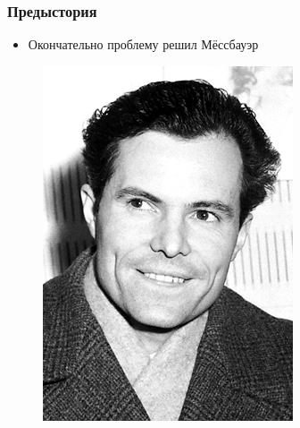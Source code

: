 \documentclass[t]{beamer}
\begin{document}
\begin{frame}
  \frametitle{Предыстория}
  \begin{itemize}
    \item Окончательно проблему решил Мёссбауэр
  \end{itemize}

  \begin{figure}[h]
    \centering
    \includegraphics[height=.7\textheight]{img/messbauer.png}
  \end{figure}
\end{frame}
\end{document}
